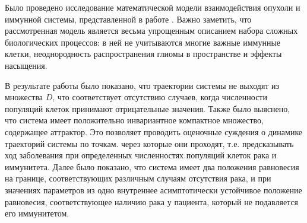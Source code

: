 \documentclass[12pt,a4paper]{extarticle}
\theoremstyle{definition}
\theoremstyle{definition}
\theoremstyle{definition}
\begin{document}
	\begin{conclusion}
	
	Было проведено исследование математической модели взаимодействия опухоли и иммунной системы, представленной в работе \cite{model}. Важно заметить, что рассмотренная модель является весьма упрощенным описанием набора сложных биологических процессов: в ней не учитываются многие важные иммунные клетки, неоднородность распространения глиомы в пространстве и эффекты насыщения.
	
	В результате работы было показано, что траектории системы не выходят из множества $D$, что соответствует отсутствию случаев, когда численности популяций клеток принимают отрицательные значения. Также было выяснено, что система имеет положительно инвариантное компактное множество, содержащее аттрактор. Это позволяет проводить оценочные суждения о динамике траекторий системы по точкам. через которые они проходят, т.е. предсказывать ход заболевания при определенных численностях популяций клеток рака и иммунитета. Далее было показано, что система имеет два положения равновесия на границе, соответствующих различным случаям отсутствия рака, и при значениях параметров из \cite{model} одно внутреннее асимптотически устойчивое положение равновесия, соответствующее наличию рака у пациента, который не подавляется его иммунитетом. 
	
	\end{conclusion}
	
\end{document}
